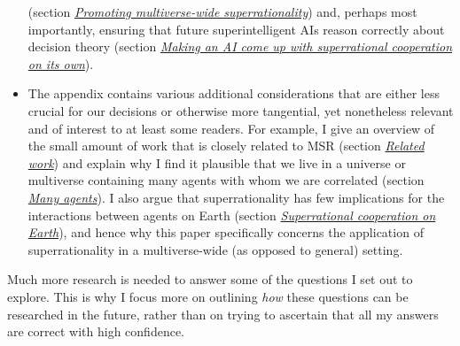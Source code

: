\begin{itemize}
  (section \protect\hyperlink{_2jzyce2p07mk}{\emph{Promoting
  multiverse-wide superrationality}}) and, perhaps most importantly,
  ensuring that future superintelligent AIs reason correctly about
  decision theory (section
  \protect\hyperlink{making-an-ai-come-up-with-superrational-cooperation-on-its-own}{\emph{Making
  an AI come up with superrational cooperation on its own}}).
\item
  The appendix contains various additional considerations that are
  either less crucial for our decisions or otherwise more tangential,
  yet nonetheless relevant and of interest to at least some readers. For
  example, I give an overview of the small amount of work that is
  closely related to MSR (section
  \protect\hyperlink{related-work}{\emph{Related work}}) and explain
  why I find it plausible that we live in a universe or multiverse
  containing many agents with whom we are correlated (section
  \protect\hyperlink{many-agents}{\emph{Many agents}}). I also argue
  that superrationality has few implications for the interactions
  between agents on Earth (section
  \protect\hyperlink{superrational-cooperation-on-earth}{\emph{Superrational
  cooperation on Earth}}), and hence why this paper specifically
  concerns the application of superrationality in a multiverse-wide (as
  opposed to general) setting.
\end{itemize}

Much more research is needed to answer some of the questions I set out
to explore. This is why I focus more on outlining \emph{how} these
questions can be researched in the future, rather than on trying to
ascertain that all my answers are correct with high confidence.

